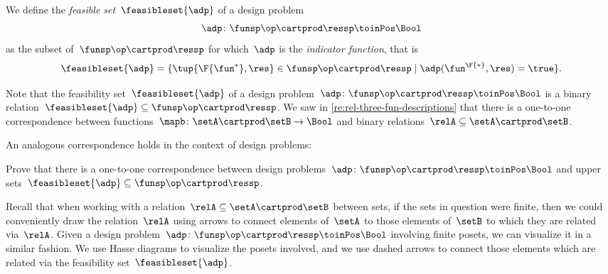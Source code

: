 \begin{definition}
    \label{def:dp-feasible-set}
    We define the \emph{feasible set}~$\feasibleset{\adp}$ of a design problem~
    \begin{equation}
        \label{eq:generic-design-prob}
        \adp\colon \funsp\op \cartprod \ressp \toinPos \Bool
    \end{equation}
    as the subset of~$\funsp \op\cartprod \ressp$ for which~$\adp$ is the \emph{indicator function}, that is%
    \begin{equation}
        \label{eq:design-prob-as-upper-set}
        \feasibleset{\adp} = \{ \tup{\F{\fun^*},\res} \in \funsp \op\cartprod \ressp  \mid %
        \adp(\fun^\F{*}, \res) = \true %
        \}.
    \end{equation}
\end{definition}

Note that the feasibility set~$\feasibleset{\adp}$ of a design problem~$\adp \colon \funsp \op \cartprod \ressp\toinPos \Bool$ is a binary relation~$\feasibleset{\adp} \subseteq \funsp\op \cartprod \ressp$.
We saw in \cref{re:rel-three-fun-descriptions} that there is a one-to-one correspondence between functions~$\mapb \colon \setA \cartprod \setB \to \Bool$ and binary relations~$\relA \subseteq \setA \cartprod \setB$.

An analogous correspondence holds in the context of design problems:

\begin{exercise}
    \label{ex:adp-uppersets}
    Prove that there is a one-to-one correspondence between design problems~$\adp \colon \funsp \op \cartprod \ressp\toinPos \Bool$ and upper sets~$\feasibleset{\adp} \subseteq \funsp\op \cartprod \ressp$.
\end{exercise}
\begin{solution}
\end{solution}

Recall that when working with a relation~$\relA \subseteq \setA \cartprod \setB$ between sets, if the sets in question were finite, then we could conveniently draw the relation~$\relA$ using arrows to connect elements of~$\setA$ to those elements of~$\setB$ to which they are related via~$\relA$.
Given a design problem~$\adp \colon \funsp \op \cartprod \ressp\toinPos \Bool$ involving finite posets, we can visualize it in a similar fashion.
We use Hasse diagrams to visualize the posets involved, and we use dashed arrows to connect those elements which are related via the feasibility set~$\feasibleset{\adp}$.

